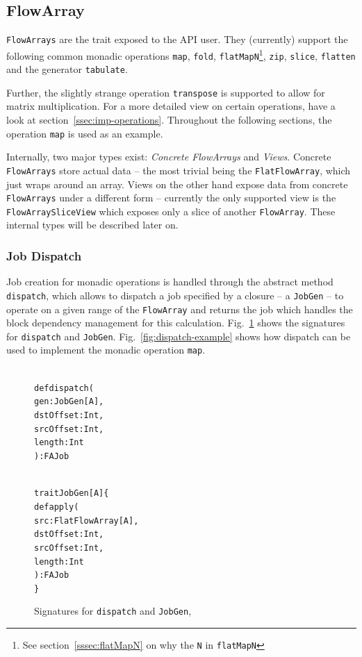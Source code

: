 \documentclass[runningheads,a4paper,fleqn]{llncs}
\begin{document}
\subsection{FlowArray}
\label{ssec:flowarray}
\texttt{FlowArrays} are the trait exposed to the API user. They (currently)
support the following common monadic operations \texttt{map},
\texttt{fold}, \texttt{flatMapN}\footnote{See
  section~\ref{sssec:flatMapN} on why the \texttt{N} in
  \texttt{flatMapN}}, \texttt{zip}, \texttt{slice}, \texttt{flatten}
and the generator \texttt{tabulate}.

Further, the slightly strange operation \texttt{transpose} is
supported
to allow for matrix multiplication. For a more detailed view on
certain operations, have a look at
section~\ref{ssec:imp-operations}. Throughout the following sections,
the operation \texttt{map} is used as an example.

Internally, two major types exist: \emph{Concrete FlowArrays} and
\emph{Views}. Concrete \texttt{FlowArrays} store actual data -- the most
trivial being the \texttt{FlatFlowArray}, which just wraps around an
array. Views on the other hand expose data from
concrete \texttt{FlowArrays} under a different form -- currently the
only supported view is the \texttt{FlowArraySliceView} which exposes
only a slice of another \texttt{FlowArray}. These internal types will be
described later on.

\subsubsection{Job Dispatch}
Job creation for monadic operations is handled through the abstract
method \texttt{dispatch}, which allows to dispatch a job specified by
a closure -- a \texttt{JobGen} -- to operate on a given range of the
\texttt{FlowArray} and returns the job which handles the block dependency
management for this calculation. Fig.~\ref{fig:dispatch-code} shows the
signatures for \texttt{dispatch} and
\texttt{JobGen}. Fig.~\ref{fig:dispatch-example} shows how dispatch
can be used to implement the monadic operation \texttt{map}.

\begin{figure}
\begin{minipage}[t]{6cm}
\begin{alltt}
{\scriptsize
def dispatch(
  gen: JobGen[A],
  dstOffset: Int,
  srcOffset: Int,
  length: Int
): FAJob
}
\end{alltt}
\end{minipage}
\begin{minipage}[t]{7cm}
\begin{alltt}
{\scriptsize
trait JobGen[A] \{
  def apply(
    src: FlatFlowArray[A],
    dstOffset: Int,
    srcOffset: Int,
    length: Int
  ): FAJob
\}
}
\end{alltt}
\end{minipage}
\caption{Signatures for \texttt{dispatch} and \texttt{JobGen}, }
\label{fig:dispatch-code}
\end{figure}
\end{document}
